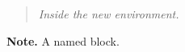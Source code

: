 \documentclass{article}
\begin{document}
\newenvironment{boxed}{\begin{quote}\itshape}{\end{quote}}
\newenvironment{named}[1]{\par\noindent\textbf{#1.}}{\par}
\begin{boxed}
Inside the new environment.
\end{boxed}
\begin{named}{Note}
A named block.
\end{named}
\end{document}
